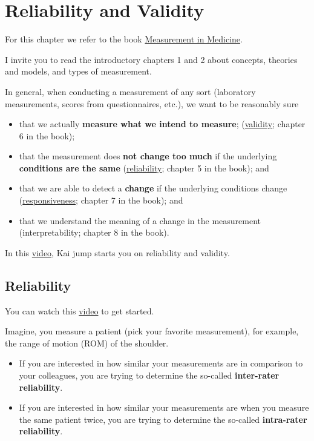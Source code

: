 \documentclass[
]{book}
\providecommand{\tightlist}{%
  \setlength{\itemsep}{0pt}\setlength{\parskip}{0pt}}
\begin{document}
\chapter{Reliability and Validity}\label{reliability-and-validity}

For this chapter we refer to the book
\href{https://www.cambridge.org/core/books/measurement-in-medicine/8BD913A1DA0ECCBA951AC4C1F719BCC5}{Measurement in Medicine}.

I invite you to read the introductory chapters 1 and 2 about concepts,
theories and models, and types of measurement.

In general, when conducting a measurement of any sort
(laboratory measurements, scores from questionnaires, etc.),
we want to be reasonably sure

\begin{itemize}
\tightlist
\item
  that we actually \textbf{measure what we intend to measure};
  (\href{https://en.wikipedia.org/wiki/Validity_(statistics)}{validity};
  chapter 6 in the book);
\item
  that the measurement does \textbf{not change too much} if the
  underlying \textbf{conditions are the same}
  (\href{https://en.wikipedia.org/wiki/Reliability_(statistics)}{reliability};
  chapter 5 in the book); and
\item
  that we are able to detect a \textbf{change} if the underlying conditions change
  (\href{https://tinyurl.com/3vdcxy49}{responsiveness}; chapter 7 in the book); and
\item
  that we understand the meaning of a change in the measurement
  (interpretability; chapter 8 in the book).
\end{itemize}

In this \href{https://www.youtube.com/watch?v=KuT2n1w0Ixc&ab_channel=Physiotutors}{video},
Kai jump starts you on reliability and validity.

\section{Reliability}\label{reliability}

You can watch this \href{https://www.youtube.com/watch?v=9HSoWaRpcys&ab_channel=Physiotutors}{video}
to get started.

Imagine, you measure a patient (pick your favorite measurement), for example,
the range of motion (ROM) of the shoulder.

\begin{itemize}
\tightlist
\item
  If you are interested in how
  similar your measurements are in comparison to your colleagues, you are
  trying to determine the so-called \textbf{inter-rater reliability}.
\item
  If you are interested in how similar your measurements are when you measure
  the same patient twice, you are trying to determine the so-called
  \textbf{intra-rater reliability}.
\end{itemize}
\end{document}
